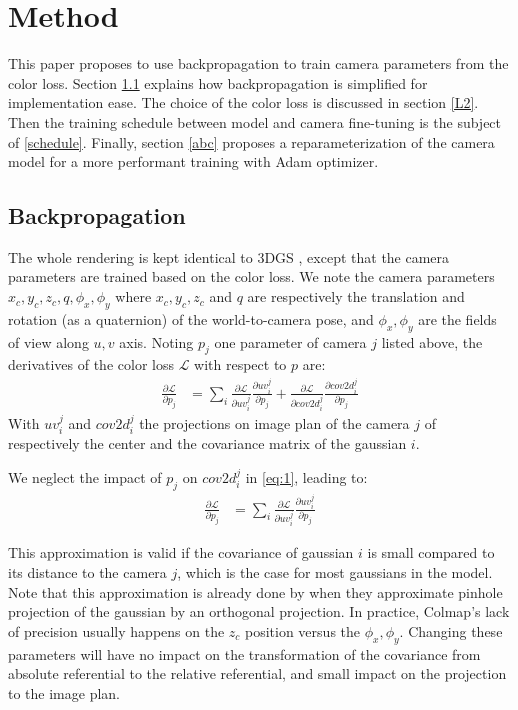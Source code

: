 \documentclass[a4paper,twoside,french]{article}
\begin{document}
\section{Method} \label{method}

This paper proposes to use backpropagation to train camera parameters from the color loss.
Section \ref{backprop} explains how backpropagation is simplified for implementation ease.
The choice of the color loss is discussed in section \ref{L2}.
Then the training schedule between model and camera fine-tuning is the subject of \ref{schedule}.
Finally, section \ref{abc} proposes a reparameterization of the camera model for a more performant training with Adam optimizer.

\subsection{Backpropagation} \label{backprop}
The whole rendering is kept identical to 3DGS \cite{kerbl20233d}, except that the camera parameters are trained based on the color loss.
We note the camera parameters $x_c,y_c,z_c,q,\phi_x,\phi_y$ where $x_c,y_c,z_c$ and $q$ are respectively the translation and rotation (as a quaternion) of the
world-to-camera pose, and $\phi_x,\phi_y$ are the fields of view along $u,v$ axis.
Noting $p_j$ one parameter of camera $j$ listed above, the derivatives of the color loss $\mathcal{L}$ with respect to $p$ are:
\begin{align}
	\label{eq:1}
	\frac{\partial \mathcal{L}}{\partial p_j} &= \sum_{i} \frac{\partial \mathcal{L}}{\partial uv_i^j} \frac{\partial uv_i^j}{\partial p_j} + \frac{\partial \mathcal{L}}{\partial cov2d_i^j} \frac{\partial cov2d_i^j}{\partial p_j}
\end{align}
With $uv_i^j$ and $cov2d_i^j$ the projections on image plan of the camera $j$ of respectively the center and the covariance matrix of the gaussian $i$.

We neglect the impact of $p_j$ on $cov2d_i^j$ in \eqref{eq:1}, leading to:
\begin{align}
	\label{eq:2}
	\frac{\partial \mathcal{L}}{\partial p_j} &= \sum_{i} \frac{\partial \mathcal{L}}{\partial uv_i^j} \frac{\partial uv_i^j}{\partial p_j}
\end{align}

This approximation is valid if the covariance of gaussian $i$ is small compared to its distance to the camera $j$,
which is the case for most gaussians in the model. Note that this approximation is already done by \cite{kerbl20233d}
when they approximate pinhole projection of the gaussian by an orthogonal projection.
In practice, Colmap's lack of precision usually happens on the $z_c$ position versus the $\phi_x,\phi_y$.
Changing these parameters will have no impact on the transformation of the covariance from absolute referential
to the relative referential, and small impact on the projection to the image plan.
\end{document}
